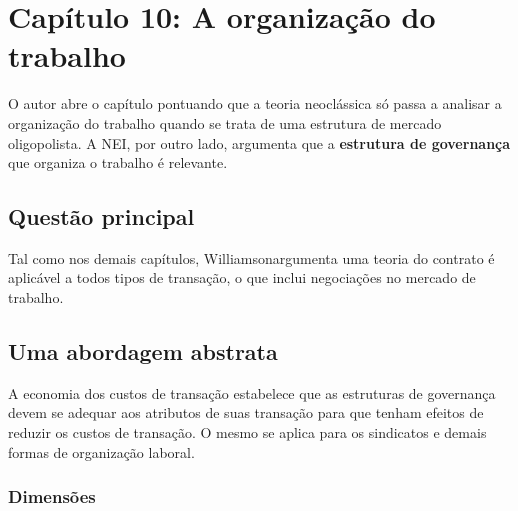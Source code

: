 \section*{Capítulo 10: A organização do trabalho}

\newcommand{\autor}{Williamson}

O autor abre o capítulo pontuando que a teoria neoclássica só passa a analisar a organização do trabalho quando se trata de uma estrutura de mercado oligopolista. A NEI, por outro lado, argumenta que a \textbf{estrutura de governança} que organiza o trabalho é relevante.

\subsection*{Questão principal}

Tal como nos demais capítulos, \autor argumenta uma teoria do contrato é aplicável a todos tipos de transação, o que inclui negociações no mercado de trabalho.

\subsection*{Uma abordagem abstrata}

A economia dos custos de transação estabelece que as estruturas de governança devem se adequar aos atributos de suas transação para que tenham efeitos de reduzir os custos de transação. O mesmo se aplica para os sindicatos e demais formas de organização laboral.

\subsubsection{Dimensões}

